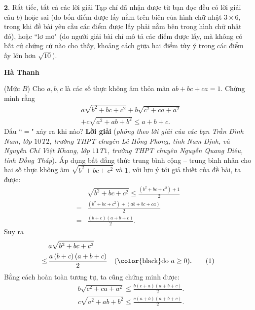 \begin{multicols}{2}
	\vskip 0.05cm 
	$\pmb{2.}$ Rất tiếc, tất cả các lời giải Tạp chí đã nhận được từ bạn đọc đều có lời giải câu $b)$ hoặc sai (do bốn điểm được lấy nằm trên biên của hình chữ nhật $3\times 6$, trong khi đề bài yêu cầu các điểm được lấy phải nằm bên trong hình chữ nhật đó), hoặc ``lơ mơ" (do người giải bài chỉ mô tả các điểm được lấy, mà không có bất cứ chứng cứ nào cho thấy, khoảng cách giữa hai điểm tùy ý trong các điểm ấy lớn hơn  $\sqrt{10}$).
	\begin{flushright}
		\textbf{\color{thachthuctoanhoc}Hà Thanh}
	\end{flushright}
	{}
	(Mức $B$) Cho $a, b, c$ là các số thực không âm thỏa mãn $a b+b c+c a=1$. Chứng minh rằng
	\begin{align*}
		&a \sqrt{b^{2}+b c+c^{2}}+b \sqrt{c^{2}+c a+a^{2}}\\
		&+c \sqrt{a^{2}+a b+b^{2}} \le a+b+c .
	\end{align*}
	Dấu ``$=$" xảy ra khi nào?
	\vskip 0.05cm
	\textbf{\color{thachthuctoanhoc}Lời giải} (\textit{phỏng theo lời giải của các bạn Trần Đình Nam, lớp $10$T$2$, trường THPT chuyên Lê Hồng Phong, tỉnh Nam Định, và Nguyễn Chí Việt Khang, lớp $11$T$1$, trường THPT chuyên Nguyễn Quang Diêu, tỉnh Đồng Tháp})\textbf{\color{thachthuctoanhoc}.}
	\vskip 0.05cm
	Áp dụng bất đẳng thức trung bình cộng -- trung bình nhân cho hai số thực không âm  $\sqrt {{b^2} + bc + {c^2}} $ và $1$, với lưu ý tới giả thiết của đề bài, ta được:
	\begin{align*}
		&\sqrt {{b^2} + bc + {c^2}}  \le \frac{{\left( {{b^2} + bc + {c^2}} \right) + 1}}{2} \\
		= &\frac{{\left( {{b^2} + bc + {c^2}} \right) + \left( {ab + bc + ca} \right)}}{2} \\
		= &\frac{{\left( {b + c} \right)\left( {a + b + c} \right)}}{2}.
	\end{align*}
	Suy ra 
	\begin{align*}
		&a\sqrt {{b^2} + bc + {c^2}}  \\
		\le\, &\frac{{a\left( {b + c} \right)\left( {a + b + c} \right)}}{2} \quad(\text{\color{black}do } a \ge 0). \tag{$1$}
	\end{align*}
	Bằng cách hoàn toàn tương tự, ta cũng chứng minh được:
	\begin{align*}
		&b\sqrt {\!{c^2} \!+\! ca \!+\! {a^2}} \le\! \frac{{b\left( {c \!+\! a} \right)\left( {a \!+\! b \!+\! c} \right)}}{2}.\tag{$2$}\\
		&c\sqrt {\!{a^2} \!+\! ab \!+\! {b^2}} \le\! \frac{{c\left( {a \!+\! b} \right)\left(\!{a \!+\! b \!+\! c} \right)}}{2}.\tag{$3$}

\end{align*}
\end{multicols}
